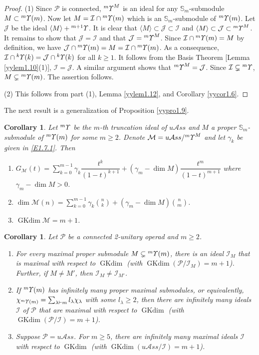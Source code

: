 \documentclass{amsart}
\newtheorem{cor}[thm]{Corollary}
\theoremstyle{definition}
\theoremstyle{remark}
\numberwithin{equation}{section}
\def\S{\mathbb{S}}
\newcommand{\lr}[1]{\langle #1 \rangle}
\newcommand{\up}[1]{{^{#1}{\it \!\Upsilon}}}
\def\la{\lambda}
\def \uas{u\mathcal{A}ss}
\def \I{\mathcal{I}}
\def \J{\mathcal{J}}
\def \ip{{\mathcal{P}}}
\def \dim{\operatorname{dim}}
\def\gkdim{\operatorname{GKdim}}
\def \S{\mathbb{S}}
\begin{document}
\begin{proof} (1) Since $\ip$ is connected, $\up{m}^M$ is an 
ideal for any $\S_{m}$-submodule $M\subset \up{m}(m)$. 
Now let $M=\I\cap \up{m}(m)$ which is an $\S_{m}$-submodule 
of $\up{m}(m)$. Let $\J$ be the ideal
$\langle M\rangle+\up{m+1}$. It is clear that 
$\lr{M}\subset \J\subset \I$ and 
$\lr{M}\subset \J\subset \up{m}^M$. It remains to show
that $\J=\I$ and that $\J=\up{m}^M$. 
Since $\I\cap \up{m}(m)=M$ by definition, we have $\J\cap 
\up{m}(m)=M=\I\cap \up{m}(m)$. As a consequence, 
$\I\cap \up{k}(k)=\J\cap \up{k}(k)$ for all $k\geq 1$. 
It follows from the Basis Theorem [Lemma 
\ref{yylem1.10}(1)], $\I=\J$. A similar argument shows that
$\up{m}^M=\J$. Since $\I\subsetneq \up{m}$, $M\subsetneq 
\up{m}(m)$. The assertion follows.

(2) This follows from part (1), Lemma \ref{yylem1.12},
and Corollary \ref{yycor1.6}.
\end{proof}

The next result is a generalization of Proposition \ref{yypro1.9}.

\begin{cor}	
\label{yycor4.6}
Let $\up{m}$ be the $m$-th truncation ideal of $\uas$ and $M$ 
a proper $\S_m$-submodule of $\up{m}(m)$ for some 
$m\ge 2$. Denote $\mathcal{M}=\uas/\up{m}^M$ and let
$\gamma_k$ be given in \eqref{E1.7.1}. Then 
\begin{enumerate}
\item[(1)] 
$G_{\mathcal{M}}(t)=\sum\limits_{k=0}^{m-1} \gamma_k
\dfrac{t^k}{(1-t)^{k+1}}+(\gamma_m-\dim M)
\dfrac{t^m}{(1-t)^{m+1}}$ where $\gamma_m-\dim M>0$.
\item[(2)] 
$\dim \mathcal{M}(n)=\sum\limits_{k=0}^{m-1} 
\gamma_k {n\choose k}+(\gamma_m-\dim M){n\choose m}$.
\item[(3)]
$\gkdim \mathcal{M}=m+1$.
\end{enumerate}
\end{cor} 


\begin{cor}
\label{yycor4.7}
Let $\ip$ be a connected 2-unitary operad and $m\geq 2$.
\begin{enumerate}
\item[(1)]
For every maximal proper submodule $M\subsetneq \up{m}(m)$,
there is an ideal $\I_{M}$ that is maximal with respect 
to $\gkdim$ {\rm{(}}with $\gkdim (\ip/\I_{M})=m+1${\rm{)}}. 
Further, if $M\neq M'$, then $\I_{M}\neq \I_{M'}$.
\item[(2)]
If $\up{m}(m)$ has infinitely many proper maximal 
submodules, or equivalently, 
$\chi_{\up{m}(m)}=\sum_{\la\vdash m}l_\la \chi_\la$  with some 
$l_\la\geq 2$, then there are infinitely many ideals 
$\I$ of $\ip$ that are maximal with respect to
$\gkdim$ {\rm{(}}with $\gkdim (\ip/\I)=m+1${\rm{)}}.
\item[(3)]
Suppose $\ip=\uas$. For $m\ge 5$, there are infinitely 
many maximal ideals $\I$ with respect to $\gkdim$ 
{\rm{(}}with $\gkdim (\uas/\I)=m+1${\rm{)}}.
\end{enumerate}
\end{cor}
\end{document}
